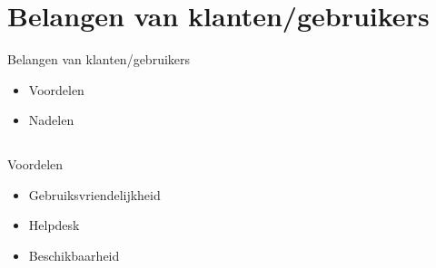 \documentclass{beamer}
\begin{document}

    

\section[Klant]{Belangen van klanten/gebruikers}
\begin{frame}{Belangen van klanten/gebruikers}
    \begin{itemize}
        \item Voordelen 
        \item Nadelen
    \end{itemize} 
\end{frame}
    \subsection{}
    \begin{frame}{Voordelen}
        \begin{itemize}
            \item Gebruiksvriendelijkheid
            \item Helpdesk
            \item Beschikbaarheid
        \end{itemize}
    \end{frame}
            
\end{document}
